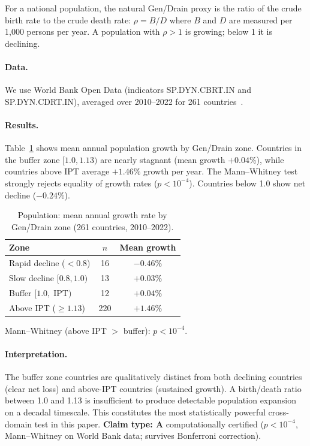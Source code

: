 \documentclass[11pt,twocolumn]{article}
\newcommand{\CatA}{\textbf{A}}
\theoremstyle{remark}
\begin{document}
For a national population, the natural Gen/Drain proxy is the ratio of the crude birth
rate to the crude death rate: $\rho = B/D$ where $B$ and $D$ are measured per 1{,}000
persons per year. A population with $\rho > 1$ is growing; below 1 it is declining.

\paragraph{Data.}
We use World Bank Open Data (indicators SP.DYN.CBRT.IN and SP.DYN.CDRT.IN), averaged
over 2010--2022 for 261 countries~\cite{WorldBankPop2024}.

\paragraph{Results.}
Table~\ref{tab:pop_zones} shows mean annual population growth by Gen/Drain zone.
Countries in the buffer zone $[1.0, 1.13)$ are nearly stagnant (mean growth $+0.04\%$),
while countries above IPT average $+1.46\%$ growth per year. The Mann--Whitney test
strongly rejects equality of growth rates ($p < 10^{-4}$). Countries below 1.0 show
net decline ($-0.24\%$).

\begin{table}[ht]
\centering
\caption{Population: mean annual growth rate by Gen/Drain zone (261 countries, 2010--2022).}
\label{tab:pop_zones}
\begin{tabular}{@{}lcc@{}}
\toprule
Zone & $n$ & Mean growth \\
\midrule
Rapid decline ($<0.8$)        & 16  & $-0.46\%$ \\
Slow decline $[0.8, 1.0)$     & 13  & $+0.03\%$ \\
Buffer $[1.0,\;\mathrm{IPT})$ & 12  & $+0.04\%$ \\
Above IPT ($\ge 1.13$)        & 220 & $+1.46\%$ \\
\bottomrule
\end{tabular}
{\small Mann--Whitney (above IPT $>$ buffer): $p < 10^{-4}$.}
\end{table}

\paragraph{Interpretation.}
The buffer zone countries are qualitatively distinct from both declining countries (clear
net loss) and above-IPT countries (sustained growth). A birth/death ratio between 1.0 and
1.13 is insufficient to produce detectable population expansion on a decadal timescale.
This constitutes the most statistically powerful cross-domain test in this paper.
\textbf{Claim type: $\CatA$} computationally certified ($p < 10^{-4}$, Mann--Whitney on World Bank data; survives Bonferroni correction).
\end{document}
